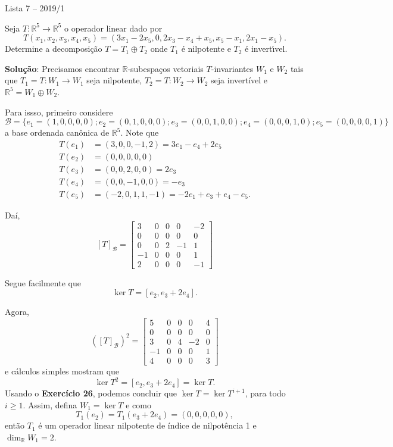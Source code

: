 \documentclass[12pt]{article}
\newcounter{exercicios}
\newcommand{\questao}{
\addtocounter{exercicios}{27}
\noindent{\bf Exerc{\'\i}cio \arabic{exercicios}: }}
\newcommand{\real}{\mathbb{R}}
\begin{document}
\begin{center}
    Lista 7 -- 2019/1
\end{center}
\questao Seja $T : \real^5 \to \real^5$ o operador linear dado por
  \[
      T(x_1,x_2,x_3,x_4,x_5) = (3x_1 -2x_5, 0 , 2x_3 - x_4 + x_5, x_5 - x_1, 2x_1 - x_5).
  \]
  Determine a decomposi\c{c}\~ao $T = T_1 \oplus T_2$ onde $T_1$ \'e nilpotente e $T_2$ \'e invert{\'\i}vel.

\textbf{Solu{\c c}{\~a}o}: Precisamos encontrar $\real$-subespaços vetoriais $T$-invariantes $W_1$ e $W_2$ tais que $T_1 = T : W_1 \to W_1$ seja nilpotente, $T_2 = T : W_2 \to W_2$ seja invertível e $\real^5 = W_1 \oplus W_2$.

Para issso, primeiro considere
\[
    \mathcal{B} = \{e_1 = (1,0,0,0,0); e_2 = (0,1,0,0,0); e_3 = (0,0,1,0,0); e_4 = (0,0,0,1,0); e_5 = (0,0,0,0,1)\}
\]
a base ordenada canônica de $\real^5$. Note que
\begin{align*}
	T(e_1) &= (3,0,0,-1,2) = 3e_1 - e_4 + 2e_5\\
	T(e_2) &= (0,0,0,0,0)\\
	T(e_3) &= (0,0,2,0,0) = 2e_3\\
	T(e_4) &= (0,0,-1,0,0) = -e_3\\
	T(e_5) &= (-2,0,1,1,-1) = -2e_1 + e_3 + e_4 - e_5.
\end{align*}

Daí,
\[
    [T]_\mathcal{B} = \begin{bmatrix}
        3 & 0 & 0 & 0 & -2\\
        0 & 0 & 0 & 0 & 0\\
        0 & 0 & 2 & -1 & 1\\
        -1 & 0 & 0 & 0 & 1\\
        2 & 0 & 0 & 0 & -1
    \end{bmatrix}
\]

Segue facilmente que
\[
 	\ker T = [e_2, e_3 + 2e_4].
\]

Agora,
\[
    ([T]_\mathcal{B})^2 = \begin{bmatrix}
        5 & 0 & 0 & 0 & 4\\
        0 & 0 & 0 & 0 & 0\\
        3 & 0 & 4 & -2 & 0\\
        -1 & 0 & 0 & 0 & 1\\
        4 & 0 & 0 & 0 & 3
    \end{bmatrix}
\]
e cálculos simples mostram que
\[
    \ker T^2 = [e_2, e_3 + 2e_4] = \ker T.
\]
Usando o \textbf{Exercício 26}, podemos concluir que $\ker T = \ker T^{i + 1}$, para todo $i \ge 1$.
Assim, defina $W_1 = \ker T$ e como
\[
	T_1(e_2) = T_1(e_3 + 2e_4) = (0,0,0,0,0),
\]
então $T_1$ é um operador linear nilpotente de índice de nilpotência 1 e $\dim_\real W_1 = 2$.
\end{document}
